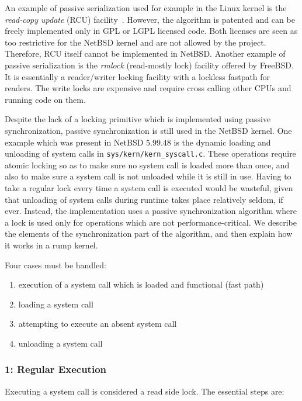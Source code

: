 An example of passive serialization used for example in the Linux
kernel is the \textit{read-copy update} (RCU)
facility~\cite{mckenney:phd}.  However, the algorithm is patented
and can be freely implemented only in GPL or LGPL licensed code.
Both licenses are seen as too restrictive for the NetBSD kernel and
are not allowed by the project.  Therefore, RCU itself cannot be
implemented in NetBSD.  Another example of passive serialization is
the \textit{rmlock} (read-mostly lock) facility offered by FreeBSD.
It is essentially a reader/writer locking facility with a lockless
fastpath for readers.  The write locks are expensive and
require cross calling other CPUs and running code on them.

Despite the lack of a locking primitive which is implemented using
passive synchronization, passive synchronization is still used in
the NetBSD kernel.  One example which was present in NetBSD 5.99.48 is the
dynamic loading and unloading of system calls in
\verb+sys/kern/kern_syscall.c+.  These operations require atomic
locking so as to make sure no system call is loaded more than once,
and also to make sure a system call is not unloaded while
it is still in use.  Having to take a regular lock every time a
system call is executed would be wasteful, given that unloading of
system calls during runtime takes place relatively seldom, if ever.
Instead, the implementation uses a passive synchronization algorithm
where a lock is used only for operations which are not performance-critical.
We describe the elements of the synchronization part
of the algorithm, and then explain how it works in a rump kernel.

Four cases must be handled:

\begin{enumerate}
\item	execution of a system call which is loaded and functional
	(fast path)
\item	loading a system call
\item	attempting to execute an absent system call
\item	unloading a system call
\end{enumerate}

\subsubsection*{1: Regular Execution}

Executing a system call is considered a read side lock.  The essential
steps are:

